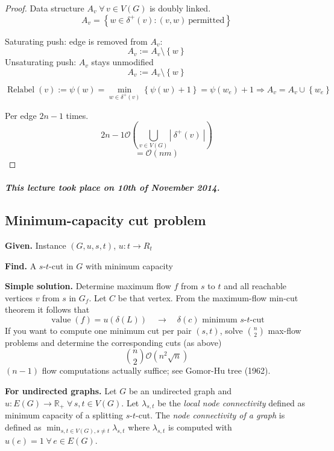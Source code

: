\documentclass[a4paper]{article}
\theoremstyle{definition}
\newcommand{\card}[1]{\left|\:\!#1\:\!\right|}
\newcommand{\set}[1]{\left\{#1\right\}}
\newcommand{\given}[1]{\textbf{Given.} #1\par}
\newcommand{\find}[1]{\textbf{Find.} #1\par}
\newcommand{\dateref}[1]{\paragraph{\textit{This lecture took place on #1.}}}
\newcommand{\fall}{\;\forall\,}
\begin{document}
\begin{proof}
  Data structure $A_v \fall v \in V(G)$ is doubly linked.
  \[ A_v = \set{w \in \delta^+(v): (v, w)\ \text{permitted}} \]

  Saturating push: edge is removed from $A_v$:
  \[ A_v := A_v \setminus \set{w} \]
  Unsaturating push: $A_v$ stays unmodified
  \[ A_v := A_v \setminus \set{w} \]

  \[
    \operatorname{Relabel}(v) := \psi(w) = \min_{w\in\delta^+(v)}{\set{\psi(w) + 1}}
      = \psi(w_e) + 1
      \Rightarrow A_v = A_v \cup \set{w_e}
  \]

  Per edge $2n-1$ times.
  \[ 2n-1 \mathcal{O}(\bigcup_{v \in V(G)} \card{\delta^+(v)}) \]
  \[ = \mathcal{O}(nm) \]
\end{proof}

\dateref{10th of November 2014}

\subsection{Minimum-capacity cut problem}
\label{section-4.5}
%
\given{Instance $(G, u, s, t)$, $u: t \rightarrow R_t$}
\find{A $s$-$t$-cut in $G$ with minimum capacity}

\textbf{Simple solution.}
  Determine maximum flow $f$ from $s$ to $t$ and all reachable vertices $v$ from $s$ in $G_f$.
  Let $C$ be that vertex. From the maximum-flow min-cut theorem it follows that
  \[
    \operatorname{value}(f) = u(\delta(L)) \quad\rightarrow\quad \delta(c) \text{ minimum $s$-$t$-cut}
  \]
  If you want to compute one minimum cut per pair $(s, t)$, solve ${n \choose 2}$ max-flow problems
  and determine the corresponding cuts (as above)
  \[
    {n \choose 2} \mathcal{O}(n^2 \sqrt{n})
  \]
  $(n-1)$ flow computations actually suffice; see Gomor-Hu tree (1962).

\textbf{For undirected graphs.}
  Let $G$ be an undirected graph and $u: E(G) \rightarrow \mathbb{R}_+ \fall s, t \in V(G)$.
  Let $\lambda_{s,t}$ be the \emph{local node connectivity} defined as minimum capacity of a splitting $s$-$t$-cut. The \emph{node connectivity of a graph} is defined as $\min_{s, t \in V(G), s \neq t} \lambda_{s,t}$ where $\lambda_{s,t}$ is computed with $u(e) = 1 \fall e \in E(G)$.
\end{document}
